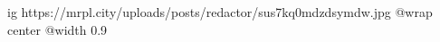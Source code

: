  
 
 
 
 

\ifcmt
  ig https://mrpl.city/uploads/posts/redactor/sus7kq0mdzdsymdw.jpg
  @wrap center
  @width 0.9
\fi
